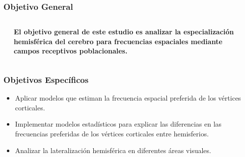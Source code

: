 \documentclass[
11pt, %
%
aspectratio=169, %
]{beamer}
\begin{document}
	\begin{frame}
		\frametitle{Objetivo General}
	\begin{columns}
		
		\begin{column}{0.2\textwidth}
			
		\end{column}
		
		\begin{column}{0.6\textwidth} %
			\centering
			\textbf{El objetivo general de este estudio es analizar la especializaci\'on hemisférica del cerebro para frecuencias espaciales mediante campos receptivos poblacionales.}
			
		\end{column}
		\begin{column}{0.2\textwidth} %
		
		
	\end{column}					
		
	\end{columns}
	
		
		
	\end{frame}
	
	\begin{frame}
		\frametitle{Objetivos Espec\'ificos}
		\begin{itemize}
			\item[1.]  Aplicar modelos que estiman la frecuencia espacial preferida de los v\'ertices corticales.
			
			\item[2.] Implementar modelos estadísticos para explicar las diferencias en las frecuencias preferidas de los v\'ertices corticales entre hemisferios.	
			
			\item[3.] Analizar la lateralización hemisférica en diferentes áreas visuales.
		\end{itemize}
		
		
	\end{frame}
	
\end{document}
